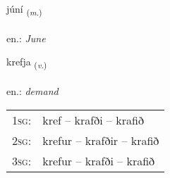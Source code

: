 \documentclass[frontgrid, backgrid]{flacards}\usepackage[]{graphicx}\usepackage[]{xcolor}
\begin{document}
\renewcommand{\flhead}{\vskip5pt \fboxsep=0pt {\small\bfseries\footnotesize Nafnorð | Noun}}
\renewcommand{\fcfoot}{\vskip5pt \fboxsep=0pt \hspace{2pt}{\small\bfseries\footnotesize 1K}}

\renewcommand{\blhead}{\vskip5pt {\small\bfseries\footnotesize Nafnorð | Noun }}
\renewcommand{\bcfoot}{\vskip5pt \hspace{2pt}{\small\bfseries\footnotesize 1K}}


{júní \small{\textsubscript{(\textit{m.})}} \\[1ex] %
\textphonetic{[juːni]} \\
en.: \emph{June} \\  [2ex]
\renewcommand*{\arraystretch}{0.8}
}

\renewcommand{\flhead}{\vskip5pt \fboxsep=0pt {\small\bfseries\footnotesize Sagnorð | Verb}}
\renewcommand{\fcfoot}{\vskip5pt \fboxsep=0pt \hspace{2pt}{\small\bfseries\footnotesize 1K}}

\renewcommand{\blhead}{\vskip5pt {\small\bfseries\footnotesize Sagnorð | Verb }}
\renewcommand{\bcfoot}{\vskip5pt \hspace{2pt}{\small\bfseries\footnotesize 1K}}


{krefja \small{\textsubscript{(\textit{v.})}} \\[1ex] %
\textphonetic{[kʰrɛvja]} \\
en.: \emph{demand} \\  [2ex]
\renewcommand*{\arraystretch}{0.8}
\begin{tabular}{p{1cm}l}
\textsc{1sg}: & kref -- krafði -- krafið \\ 
\textsc{2sg}: & krefur -- krafðir -- krafið \\ 
\textsc{3sg}: & krefur -- krafði -- krafið \\ 
\end{tabular}
}
\end{document}
